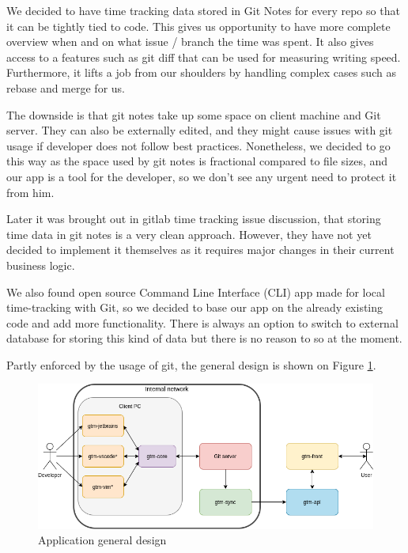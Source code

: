 
We decided to have time tracking data stored in Git Notes for every repo so that it can be tightly tied to code.
This gives us opportunity to have more complete overview when and on what issue / branch the time was spent.
It also gives access to a features such as git diff that can be used for measuring writing speed.
Furthermore, it lifts a job from our shoulders by handling complex cases such as rebase and merge for us.

The downside is that git notes take up some space on client machine and Git server.
They can also be externally edited, and they might cause issues with git usage if developer does not follow best practices.
Nonetheless, we decided to go this way as the space used by git notes is fractional compared to file sizes, and our app is a tool for the developer,
so we don't see any urgent need to protect it from him.

Later it was brought out in gitlab time tracking issue discussion, that storing time data in git notes is a very clean approach.
However, they have not yet decided to implement it themselves as it requires major changes in their current business logic.
\cite{gitlab-time-issue}

We also found open source Command Line Interface (CLI) app made for local time-tracking with Git, so we decided to base our app on the already existing code and add more functionality.
There is always an option to switch to external database for storing this kind of data but there is no reason to so at the moment.

Partly enforced by the usage of git, the general design is shown on Figure
\ref{fig:project-archidecture}.

\begin{figure}[h]
    \includegraphics[width=\textwidth]{figures/project_archidecture}
    \caption{Application general design}
    \label{fig:project-archidecture}
\end{figure}

